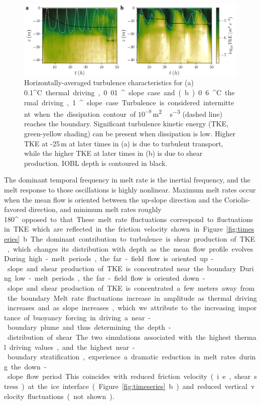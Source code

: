 \documentclass[tc, manuscript]{copernicus}
\begin{document}
\begin{figure}[t]
\includegraphics[width=12cm]{fig6.pdf}
\caption{Horizontally-averaged turbulence characteristics for (a) 0.1\unit{^{\circ}C} thermal driving, 0.01\unit{^{\circ}} slope case and (b) 0.6\unit{^{\circ}C} thermal driving, 1\unit{^{\circ}} slope case. Turbulence is considered intermittent when the dissipation contour of $10^{-9}$\,\unit{m^2\,s^{-3}} (dashed line) reaches the boundary. Significant turbulence kinetic energy (TKE, green-yellow shading) can be present when dissipation is low. Higher TKE at -25\,\unit{m} at later times in (a) is due to turbulent transport, while the higher TKE at later times in (b) is due to shear production. IOBL depth is contoured in black. }
\label{fig:intermittency}
\end{figure}

The dominant temporal frequency in melt rate is the inertial frequency, and the melt response to those oscillations is highly nonlinear. Maximum melt rates occur when the mean flow is oriented between the up-slope direction and the Coriolis-favored direction, and minimum melt rates roughly 180\unit{^{\circ}} opposed to that. These melt rate fluctuations correspond to fluctuations in TKE which are reflected in the friction velocity shown in Figure \ref{fig:timeseries}b. The dominant contribution to turbulence is shear production of TKE, which changes its distribution with depth as the mean flow profile evolves. During high-melt periods, the far-field flow is oriented up-slope and shear production of TKE is concentrated near the boundary. During low-melt periods, the far-field flow is oriented down-slope and shear production of TKE is concentrated a few meters away from the boundary. Melt rate fluctuations increase in amplitude as thermal driving increases and as slope increases, which we attribute to the increasing importance of buoyancy forcing in driving a near-boundary plume and thus determining the depth-distribution of shear. The two simulations associated with the highest thermal driving values, and the highest near-boundary stratification, experience a dramatic reduction in melt rates during the down-slope flow period. This coincides with reduced friction velocity (i.e., shear stress) at the ice interface (Figure \ref{fig:timeseries}b) and reduced vertical velocity fluctuations (not shown). 
\end{document}

